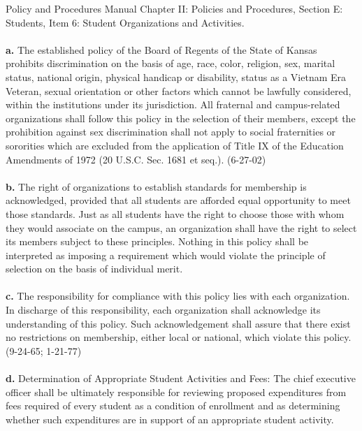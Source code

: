 Policy and Procedures Manual Chapter II: Policies and Procedures, Section E: Students, Item 6: Student Organizations and Activities.
\\
\\
\textbf{a.} The established policy of the Board of Regents of the State of Kansas prohibits discrimination on the basis of age, race, color, religion, sex, marital status, national origin, physical handicap or disability, status as a Vietnam Era Veteran, sexual orientation or other factors which cannot be lawfully considered, within the institutions under its jurisdiction. All fraternal and campus-related organizations shall follow this policy in the selection of their members, except the prohibition against sex discrimination shall not apply to social fraternities or sororities which are excluded from the application of Title IX of the Education Amendments of 1972 (20 U.S.C. Sec. 1681 et seq.). (6-27-02)
\\
\\
\textbf{b.} The right of organizations to establish standards for membership is acknowledged, provided that all students are afforded equal opportunity to meet those standards. Just as all students have the right to choose those with whom they would associate on the campus, an organization shall have the right to select its members subject to these principles. Nothing in this policy shall be interpreted as imposing a requirement which would violate the principle of selection on the basis of individual merit.
\\
\\
\textbf{c.} The responsibility for compliance with this policy lies with each organization. In discharge of this responsibility, each organization shall acknowledge its understanding of this policy. Such acknowledgement shall assure that there exist no restrictions on membership, either local or national, which violate this policy. (9-24-65; 1-21-77)
\\
\\
\textbf{d.} Determination of Appropriate Student Activities and Fees: The chief executive officer shall be ultimately responsible for reviewing proposed expenditures from fees required of every student as a condition of enrollment and as determining whether such expenditures are in support of an appropriate student activity.



